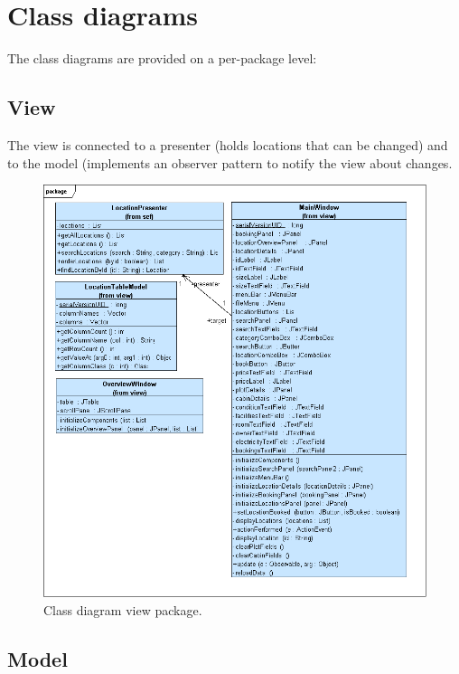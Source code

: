 \chapter{Class diagrams}\label{ch:class_diagrams} %

The class diagrams are provided on a per-package level:

\section{View}

The view is connected to a presenter (holds locations that can be changed) and to the model (implements an observer pattern to notify the view about changes.

\begin{figure}[H]
\begin{center}
\includegraphics[width=\textwidth]{gfx/class_view.png} 
\end{center}
\caption{Class diagram view package.}
\label{fig:view}
\end{figure}

\section{Model}

